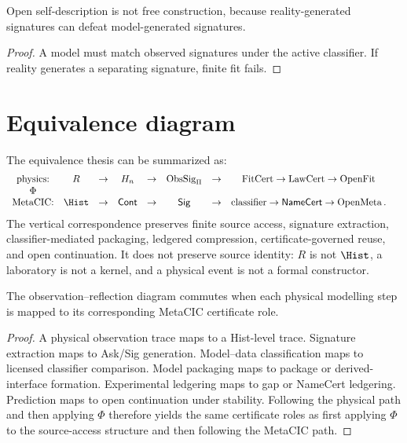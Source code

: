 \begin{corollary}
\label{cor:world-constrains-self-description}
Open self-description is not free construction, because reality-generated signatures can defeat model-generated signatures.
\end{corollary}

\begin{proof}
A model must match observed signatures under the active classifier. If reality generates a separating signature, finite fit fails.
\end{proof}

\section{Equivalence diagram}
\label{sec:equivalence-diagram}

The equivalence thesis can be summarized as:
$$
\begin{array}{ccccccccc}
\text{physics:}
&
R
&\to&
H_n
&\to&
\operatorname{ObsSig}_{\Pi}
&\to&
\operatorname{FitCert}
\to
\operatorname{LawCert}
\to
\operatorname{OpenFit}
\\
\Phi
&&&&&&&&
\\
\text{MetaCIC:}
&
\Hist
&\to&
\mathsf{Cont}
&\to&
\mathsf{Sig}
&\to&
\text{classifier}
\to
\mathsf{NameCert}
\to
\operatorname{OpenMeta}.
\end{array}
$$
The vertical correspondence preserves finite source access, signature extraction, classifier-mediated packaging, ledgered compression, certificate-governed reuse, and open continuation. It does not preserve source identity: $R$ is not $\Hist$, a laboratory is not a kernel, and a physical event is not a formal constructor.

\begin{theorem}
\label{thm:equivalence-diagram-commutes-certification}
The observation--reflection diagram commutes when each physical modelling step is mapped to its corresponding MetaCIC certificate role.
\end{theorem}

\begin{proof}
A physical observation trace maps to a Hist-level trace. Signature extraction maps to Ask/Sig generation. Model--data classification maps to licensed classifier comparison. Model packaging maps to package or derived-interface formation. Experimental ledgering maps to gap or NameCert ledgering. Prediction maps to open continuation under stability. Following the physical path and then applying $\Phi$ therefore yields the same certificate roles as first applying $\Phi$ to the source-access structure and then following the MetaCIC path.
\end{proof}


